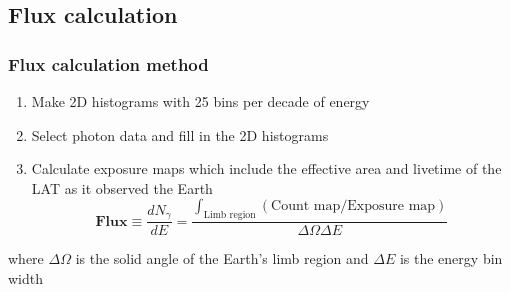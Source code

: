 \documentclass{beamer}
\begin{document}
\subsection{Flux calculation}
\begin{frame}
\frametitle{Flux calculation method}
\begin{enumerate}
  \item Make 2D histograms with 25 bins per decade of energy
  \item Select photon data and fill in the 2D histograms
  \item Calculate exposure maps which include the effective area and livetime of the LAT as it observed the Earth
  \begin{equation}
    \textbf{Flux} \equiv \frac{dN_\gamma}{dE} = \frac{\int_{\text{Limb region}}(\text{Count map}/\text{Exposure map})}{\Delta\Omega\Delta E }
  \end{equation}
\end{enumerate}
where $\Delta\Omega$ is the solid angle of the Earth's limb region and $\Delta E$ is the energy bin width
\end{frame}




\end{document}
